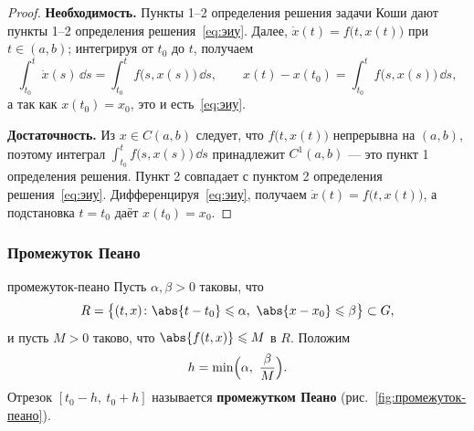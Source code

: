 \begin{proof}
	\textbf{Необходимость.} Пункты 1--2 определения решения задачи Коши дают
	пункты 1--2 определения решения~\eqref{eq:эиу}. Далее,
	$\dot x(t) = f\bigl(t, x(t)\bigr)$ при $t \in (a,b)$; интегрируя от $t_0$
	до $t$, получаем
	\[
	\int_{t_0}^{t} \dot x(s)\,\dd s = \int_{t_0}^{t} f\bigl(s, x(s)\bigr)\,\dd s,
	\qquad
	x(t) - x(t_0) = \int_{t_0}^{t} f\bigl(s, x(s)\bigr)\,\dd s,
	\]
	а так как $x(t_0) = x_0$, это и есть~\eqref{eq:эиу}.

	\medskip
	\textbf{Достаточность.} Из $x \in C(a,b)$ следует, что
	$f\bigl(t, x(t)\bigr)$ непрерывна на $(a,b)$, поэтому интеграл
	$\int_{t_0}^{t} f\bigl(s,x(s)\bigr)\,\dd s$ принадлежит $C^1(a,b)$ ---
	это пункт 1 определения решения. Пункт 2 совпадает с пунктом 2
	определения решения~\eqref{eq:эиу}. Дифференцируя~\eqref{eq:эиу},
	получаем $\dot x(t) = f\bigl(t, x(t)\bigr)$, а подстановка $t = t_0$ даёт
	$x(t_0) = x_0$.
\end{proof}

\subsubsection*{Промежуток Пеано}

\begin{Definition}{}{промежуток-пеано}
	Пусть $\alpha, \beta > 0$ таковы, что
	\[
	R = \bigl\{(t,x) \colon \abs{t - t_0} \leqslant \alpha,\
	\abs{x - x_0} \leqslant \beta\bigr\} \subset G,
	\]
	и пусть $M > 0$ таково, что $\abs{f(t,x)} \leqslant M$ в $R$. Положим
	\[
	h = \min\Bigl(\alpha,\ \frac{\beta}{M}\Bigr).
	\]
	Отрезок $[t_0 - h,\ t_0 + h]$ называется \textbf{промежутком Пеано}
	(рис.~\ref{fig:промежуток-пеано}).
\end{Definition}

